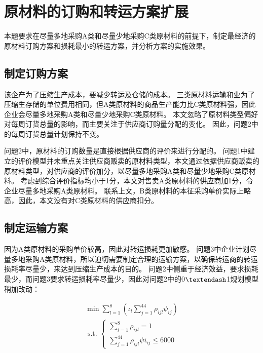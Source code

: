 
\section{原材料的订购和转运方案扩展}

本题要求在尽量多地采购A类和尽量少地采购C类原材料的前提下，制定最经济的原材料订购方案和损耗最小的转运方案，并分析方案的实施效果。

\subsection{制定订购方案}

该企产为了压缩生产成本，要减少转运及仓储的成本。
三类原材料运输和业为了压缩生存储的单位费用相同，但A类原材料的商品生产能力比C类原材料强，因此企业会尽量多地采购A类和尽量少地采购C类原材料。
本文忽略了原材料类型偏好对每周订货总量的影响，而主要关注于供应商订购量分配的变化。
因此，问题2中的每周订货总量计划保持不变。

问题2中，原材料的订购数量是直接根据供应商的评价来进行分配的。
问题1中建立的评价模型并未重点关注供应商贩卖的原材料类型，本文通过依据供应商贩卖的原材料类型，对供应商的评价加分，以尽量多地采购A类和尽量少地采购C类原材料。
考虑到综合评价指标均小于1分，本文对售卖A类原材料的供应商加1分，令企业尽量多地采购A类原材料。
联系上文，B类原材料的本征采购单价实际上略高，因此，本文没有对C类原材料的供应商扣分。

\subsection{制定运输方案}

因为A类原材料的采购单价较高，因此对转运损耗更加敏感。
问题3中企业计划尽量多地采购A类原材料，所以迫切需要制定合理的运输方案，以确保转运商的转运损耗率尽量少，来达到压缩生产成本的目的。
问题2中侧重于经济效益，要求损耗最少，而问题3要求转运损耗率尽量少，因此对问题2中的0$\textendash$1规划模型稍加改动：

\begin{equation}
\begin{array}{l}
\min \sum_{l=1}^{8}\left(\iota_{l} \sum_{j=1}^{44} \rho_{i j l} \psi_{i j}\right) \\
\text { s.t. }\left\{\begin{array}{l}
\sum_{i=1}^{8} \rho_{i j l}=1 \\
\sum_{j=1}^{44} \rho_{i j l} \psi i_{i j} \leq 6000
\end{array}\right.
\end{array}
\end{equation}

